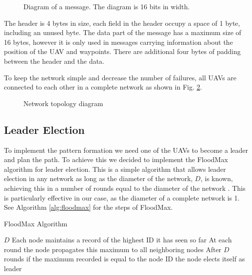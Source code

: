 \begin{figure}[h]
	\begin{center}
		
	\end{center}
	\caption{Diagram of a message. The diagram is 16 bits in width.}\label{fig:packet}
\end{figure}

The header is 4 bytes in size, each field in the header occupy a space of 1 byte, including an 
unused byte. The data part of the message has a maximum size of 16 bytes, however it is only 
used in messages carrying information about the position of the UAV and waypoints. There are 
additional four bytes of padding between the header and the data.

To keep the network simple and decrease the number of failures, all UAVs are connected to each 
other in a complete network as shown in Fig. \ref{fig:net}.

\begin{figure}
	\begin{center}
		
	\end{center}
	\caption{Network topology diagram}\label{fig:net}
\end{figure}

\subsection{Leader Election}

To implement the pattern formation we need one of the UAVs to become a leader and plan the path. 
To achieve this we decided to implement the FloodMax algorithm for leader election. This is a 
simple algorithm that allows leader election in any network as long as the diameter of the network, $D$,
is known, achieving this in a number of rounds equal to the diameter of the network \autocite{EK23}. 
This is particularly effective in our case, as the diameter of a complete network is 1. See Algorithm
\ref{alg:floodmax} for the steps of FloodMax.

\begin{algorithm}
	\algrenewcommand{}
	\algrenewcommand{}
	\caption{FloodMax Algorithm}\label{alg:floodmax}
	\begin{algorithmic}[1]
		\Require $D$
		\State Each node maintains a record of the highest ID it has seen so far 
		\State At each round the node propagates this maximum to all neighboring nodes
		\State After $D$ rounds if the maximum recorded is equal to the node ID the node elects itself as leader
	\end{algorithmic}
\end{algorithm}


